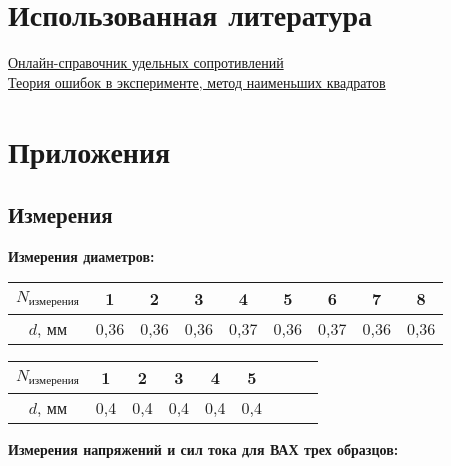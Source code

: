 \documentclass[12pt]{article}
\begin{document}
\section{Использованная литература}
\begin{thebibliography}
\href{https://dpva.ru/Guide/GuidePhysics/ElectricityAndMagnethism/ElectricalResistanceAndConductivity/ElectricResistancePerVolumeMetalls1/}{Онлайн-справочник удельных сопротивлений}\\
\href{https://npm.mipt.ru/books/lab-intro/main.pdf}{Теория ошибок в эксперименте, метод наименьших квадратов}

\section*{Приложения}
\subsection*{Измерения}
\textbf{Измерения диаметров:}
\begin{table}[H]
\label{sec: length measurements}
    \begin{minipage}[c]{0.55\textwidth}
    \centering
    \small
    \begin{tabular}{|c|c|c|c|c|c|c|c|c|}
        \hline
        $N_\text{измерения}$ & 1 & 2 & 3 & 4 & 5 & 6 & 7 & 8 \\ \hline
        $d$, мм & 0,36 & 0,36 & 0,36 & 0,37 & 0,36 & 0,37 & 0,36 & 0,36\\ \hline
    \end{tabular}
    \end{minipage}
    \begin{minipage}[c]{0.5\textwidth}
    \centering
    \small
    \begin{tabular}{|c|c|c|c|c|c|c|c|c|}
        \hline
        $N_\text{измерения}$ & 1 & 2 & 3 & 4 & 5 \\ \hline
        $d$, мм & 0,4 & 0,4 & 0,4 & 0,4 & 0,4 \\ \hline
        
    \end{tabular}
    \end{minipage}
\end{table} %

\textbf{Измерения напряжений и сил тока для ВАХ трех образцов:}

\end{thebibliography}
\end{document}
